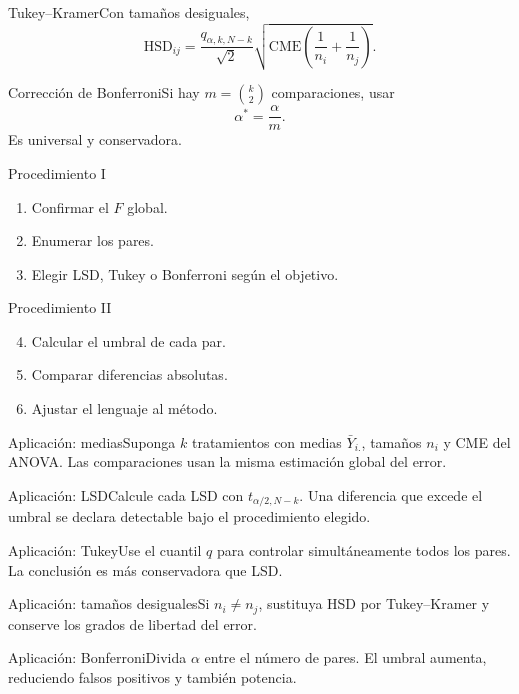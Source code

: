 \documentclass[10pt,aspectratio=169]{beamer}
\begin{document}
\begin{frame}{Tukey--Kramer}\small Con tamaños desiguales,\[\mathrm{HSD}_{ij}=\frac{q_{\alpha,k,N-k}}{\sqrt2}\sqrt{\mathrm{CME}\left(\frac1{n_i}+\frac1{n_j}\right)}.\]\end{frame}
\begin{frame}{Corrección de Bonferroni}\small Si hay $m=\binom{k}{2}$ comparaciones, usar\[\alpha^*=\frac{\alpha}{m}.\]Es universal y conservadora.\end{frame}
\begin{frame}{Procedimiento I}\small\begin{enumerate}\item Confirmar el $F$ global.\item Enumerar los pares.\item Elegir LSD, Tukey o Bonferroni según el objetivo.\end{enumerate}\end{frame}
\begin{frame}{Procedimiento II}\small\begin{enumerate}\setcounter{enumi}{3}\item Calcular el umbral de cada par.\item Comparar diferencias absolutas.\item Ajustar el lenguaje al método.\end{enumerate}\end{frame}
\begin{frame}{Aplicación: medias}\small Suponga $k$ tratamientos con medias $\bar Y_{i.}$, tamaños $n_i$ y CME del ANOVA. Las comparaciones usan la misma estimación global del error.\end{frame}
\begin{frame}{Aplicación: LSD}\small Calcule cada LSD con $t_{\alpha/2,N-k}$. Una diferencia que excede el umbral se declara detectable bajo el procedimiento elegido.\end{frame}
\begin{frame}{Aplicación: Tukey}\small Use el cuantil $q$ para controlar simultáneamente todos los pares. La conclusión es más conservadora que LSD.\end{frame}
\begin{frame}{Aplicación: tamaños desiguales}\small Si $n_i\neq n_j$, sustituya HSD por Tukey--Kramer y conserve los grados de libertad del error.\end{frame}
\begin{frame}{Aplicación: Bonferroni}\small Divida $\alpha$ entre el número de pares. El umbral aumenta, reduciendo falsos positivos y también potencia.\end{frame}
\end{document}
